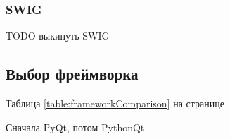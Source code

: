 \documentclass[14pt]{matmex-diploma-custom}
\begin{document}




\subsubsection{SWIG}
TODO выкинуть SWIG

\subsection{Выбор фреймворка}

Таблица \ref{table:frameworkComparison} на странице \pageref{table:frameworkComparison}

Сначала PyQt, потом PythonQt

\end{document}
